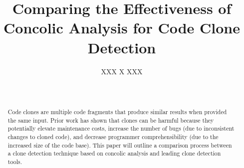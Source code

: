\documentclass{sig-alternate}
\newif\ifisnopii
\begin{document}
%

\title{Comparing the Effectiveness of Concolic Analysis for Code Clone Detection }
%
\ifisnopii %
\author{
%
\alignauthor
Daniel E. Krutz and Samuel A. Malachowsky\\ 	
	\affaddr{Software Engineering Department}\\
       \affaddr{Rochester Institute of Technology}\\
       \affaddr{1 Lomb Memorial Drive}\\
       \affaddr{Rochester, NY 14623} \\
       \email{\{dxkvse, samvse\}@rit.edu}
} %
\else %
\author{
\alignauthor
XXX X XXX\\
       \\
       \\
}
\fi %



\maketitle
\begin{abstract}

Code clones are multiple code fragments that produce similar results when provided the same input. Prior work has shown that clones can be harmful because they potentially elevate maintenance costs, increase the number of bugs (due to inconsistent changes to cloned code), and decrease programmer comprehensibility (due to the increased size of the code base). This paper will outline a comparison process between a clone detection technique based on concolic analysis and leading clone detection tools. %

\end{abstract}
\end{document}
